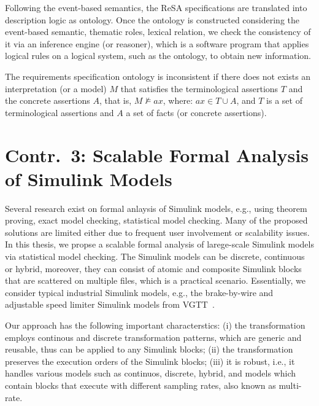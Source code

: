 Following the event-based semantics, the ReSA specifications are translated into description logic as ontology. Once the ontology is constructed considering the event-based semantic, thematic roles, lexical relation, we check the consistency of it via an inference engine (or reasoner), which is a software program that applies logical rules on a logical system, such as the ontology, to obtain new information.
\begin{definition}
	The requirements specification ontology is inconsistent if there does not exists an interpretation (or a model) $M$ that satisfies the terminological assertions $T$ and the concrete assertions $A$, that is, $M \not\models ax$, where: $ax \in T \cup A$, and $T$ is a set of terminological assertions and $A$  a set of facts (or concrete assertions).
\end{definition}

\section{Contr.~3: {Scalable Formal Analysis of Simulink Models}}\label{rc_sim}
Several research exist on formal anlaysis of Simulink models, e.g., using theorem proving, exact model checking, statistical model checking. Many of the proposed solutions are  limited either due to frequent user involvement or scalability issues. In this thesis, we propse a scalable formal analysis of larege-scale Simulink models via statistical model checking. The Simulink models can be discrete, continuous or hybrid, moreover, they can consist of atomic and composite Simulink blocks that are scattered on multiple files, which is a practical scenario. Essentially, we consider typical industrial Simulink models, e.g., the brake-by-wire and adjustable speed limiter Simulink models from VGTT~\cite{Filipovikj2018SimppaalModels}.

Our approach has the following important characterstics: (i) the transformation employs continous and discrete transformation patterns, which are generic and reusable, thus can be applied to any Simulink blocks; (ii) the transformation preserves the execution orders of the Simulink blocks; (iii) it is robust, i.e., it handles various models such as continuos, discrete, hybrid, and models which contain blocks that execute with different sampling rates, also known as multi-rate.

